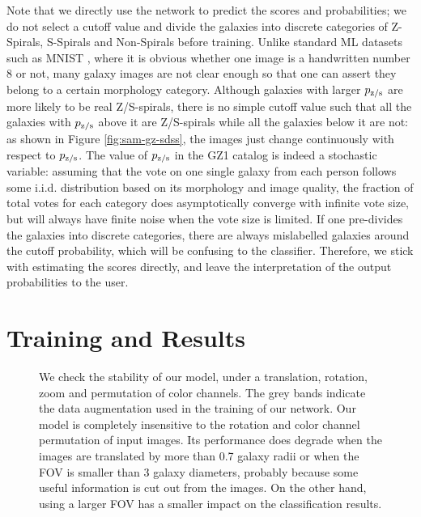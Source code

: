 \documentclass[twocolumn]{aastex631}
\begin{document}
Note that we directly use the network to predict the scores and probabilities; we do not select a cutoff value and divide the galaxies into discrete categories of Z-Spirals, S-Spirals and Non-Spirals before training.
Unlike standard ML datasets such as MNIST \citep{lecun1998gradient}, where it is obvious whether one image is a handwritten number 8 or not, many galaxy images are not clear enough so that one can assert they belong to a certain morphology category.
Although galaxies with larger $p_{\rm z/s}$ are more likely to be real Z/S-spirals, there is no simple cutoff value such that all the galaxies with $p_{\rm z/s}$ above it are Z/S-spirals while all the galaxies below it are not: as shown in Figure \ref{fig:sam-gz-sdss}, the images just change continuously with respect to $p_{\rm z/s}$.
The value of $p_{\rm z/s}$ in the GZ1 catalog is indeed a stochastic variable: assuming that the vote on one single galaxy from each person follows some i.i.d. distribution based on its morphology and image quality, the fraction of total votes for each category does asymptotically converge with infinite vote size, but will always have finite noise when the vote size is limited.
If one pre-divides the galaxies into discrete categories, there are always mislabelled galaxies around the cutoff probability, which will be confusing to the classifier.
Therefore, we stick with estimating the scores directly, and leave the interpretation of the output probabilities to the user.


\section{Training and Results}

\label{sec:train}

\begin{figure}
    \caption{We check the stability of our model, under a translation, rotation, zoom and permutation of color channels.
    The grey bands indicate the data augmentation used in the training of our network.
    Our model is completely insensitive to the rotation and color channel permutation of input images.
    Its performance does degrade when the images are translated by more than 0.7 galaxy radii or when the FOV is smaller than 3 galaxy diameters, probably because some useful information is cut out from the images.
    On the other hand, using a larger FOV has a smaller impact on the classification results.}
    \label{fig:stable}
\end{figure}
\end{document}
